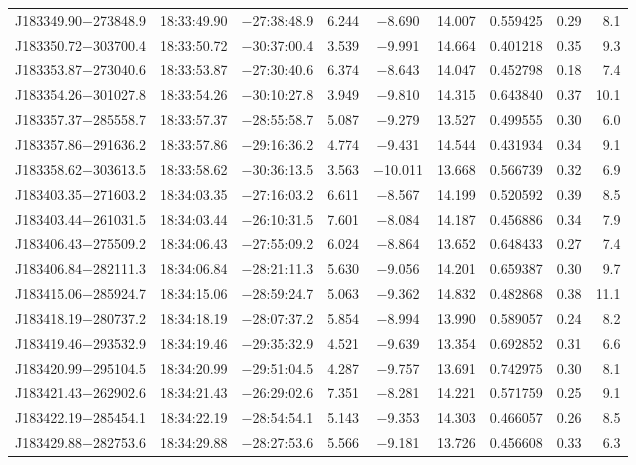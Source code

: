 \begin{table*}
\begin{tabular}{lcccccccr}
J183349.90$-$273848.9 & 18:33:49.90 & $-$27:38:48.9 &  6.244 & $-$8.690 & 14.007 & 0.559425 & 0.29 & 8.1 \\
J183350.72$-$303700.4 & 18:33:50.72 & $-$30:37:00.4 &  3.539 & $-$9.991 & 14.664 & 0.401218 & 0.35 & 9.3 \\
J183353.87$-$273040.6 & 18:33:53.87 & $-$27:30:40.6 &  6.374 & $-$8.643 & 14.047 & 0.452798 & 0.18 & 7.4 \\
J183354.26$-$301027.8 & 18:33:54.26 & $-$30:10:27.8 &  3.949 & $-$9.810 & 14.315 & 0.643840 & 0.37 & 10.1 \\
J183357.37$-$285558.7 & 18:33:57.37 & $-$28:55:58.7 &  5.087 & $-$9.279 & 13.527 & 0.499555 & 0.30 & 6.0 \\
J183357.86$-$291636.2 & 18:33:57.86 & $-$29:16:36.2 &  4.774 & $-$9.431 & 14.544 & 0.431934 & 0.34 & 9.1 \\
J183358.62$-$303613.5 & 18:33:58.62 & $-$30:36:13.5 &  3.563 & $-$10.011 & 13.668 & 0.566739 & 0.32 & 6.9 \\
J183403.35$-$271603.2 & 18:34:03.35 & $-$27:16:03.2 &  6.611 & $-$8.567 & 14.199 & 0.520592 & 0.39 & 8.5 \\
J183403.44$-$261031.5 & 18:34:03.44 & $-$26:10:31.5 &  7.601 & $-$8.084 & 14.187 & 0.456886 & 0.34 & 7.9 \\
J183406.43$-$275509.2 & 18:34:06.43 & $-$27:55:09.2 &  6.024 & $-$8.864 & 13.652 & 0.648433 & 0.27 & 7.4 \\
J183406.84$-$282111.3 & 18:34:06.84 & $-$28:21:11.3 &  5.630 & $-$9.056 & 14.201 & 0.659387 & 0.30 & 9.7 \\
J183415.06$-$285924.7 & 18:34:15.06 & $-$28:59:24.7 &  5.063 & $-$9.362 & 14.832 & 0.482868 & 0.38 & 11.1 \\
J183418.19$-$280737.2 & 18:34:18.19 & $-$28:07:37.2 &  5.854 & $-$8.994 & 13.990 & 0.589057 & 0.24 & 8.2 \\
J183419.46$-$293532.9 & 18:34:19.46 & $-$29:35:32.9 &  4.521 & $-$9.639 & 13.354 & 0.692852 & 0.31 & 6.6 \\
J183420.99$-$295104.5 & 18:34:20.99 & $-$29:51:04.5 &  4.287 & $-$9.757 & 13.691 & 0.742975 & 0.30 & 8.1 \\
J183421.43$-$262902.6 & 18:34:21.43 & $-$26:29:02.6 &  7.351 & $-$8.281 & 14.221 & 0.571759 & 0.25 & 9.1 \\
J183422.19$-$285454.1 & 18:34:22.19 & $-$28:54:54.1 &  5.143 & $-$9.353 & 14.303 & 0.466057 & 0.26 & 8.5 \\
J183429.88$-$282753.6 & 18:34:29.88 & $-$28:27:53.6 &  5.566 & $-$9.181 & 13.726 & 0.456608 & 0.33 & 6.3 \\

\end{tabular}
\end{table*}
